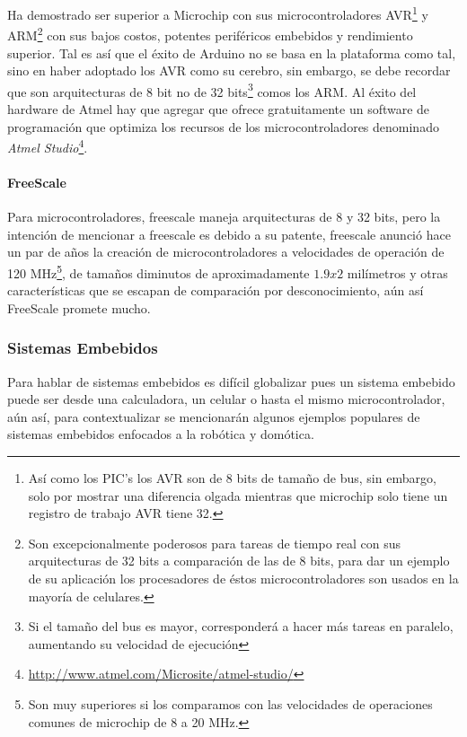 \documentclass{article}
\begin{document}
Ha demostrado ser superior a Microchip con sus microcontroladores 
AVR\footnote{Así como los PIC's los AVR son de 8 bits
de tamaño de bus, sin embargo, solo por mostrar una diferencia olgada
 mientras que microchip solo tiene un registro de trabajo AVR tiene 32.} y ARM\footnote{Son excepcionalmente poderosos para tareas de tiempo real
		 con sus arquitecturas de 32 bits a comparación de las de 8 bits,
 para dar un ejemplo de su aplicación los procesadores de éstos 
 microcontroladores son usados en la mayoría de celulares.} con sus bajos
 costos, potentes periféricos embebidos y rendimiento superior. Tal es así
 que el éxito de Arduino no se basa en la plataforma como tal, sino en 
 haber adoptado los AVR como su cerebro, sin embargo, se debe recordar que
 son arquitecturas de 8 bit no de 32 bits\footnote{Si el tamaño del bus
		 es mayor, corresponderá a hacer más tareas en paralelo, aumentando
 su velocidad de ejecución} comos los ARM. Al éxito del hardware de Atmel
 hay que agregar que ofrece gratuitamente un software de programación
 que optimiza los recursos de los microcontroladores denominado 
 \textit{Atmel Studio}\footnote{\url{http://www.atmel.com/Microsite/atmel-studio/}}. 

\paragraph{FreeScale}

Para microcontroladores, freescale maneja arquitecturas de 8 y 32 bits, pero
la intención de mencionar a freescale es debido a su patente, freescale
anunció hace un par de años la creación de microcontroladores a velocidades
de operación de 120 MHz\footnote{Son muy superiores si los comparamos con
las velocidades de operaciones comunes de microchip de 8 a 20 MHz.}, de 
tamaños diminutos de aproximadamente $1.9 x 2$ milímetros y otras 
características que se escapan de comparación por desconocimiento, aún así
FreeScale promete mucho.

\subsubsection{Sistemas Embebidos}

Para hablar de sistemas embebidos es difícil globalizar pues un sistema
embebido puede ser desde una calculadora, un celular o hasta el mismo 
microcontrolador, aún así, para contextualizar se mencionarán algunos
ejemplos populares de sistemas embebidos enfocados a la robótica y domótica.
\end{document}
